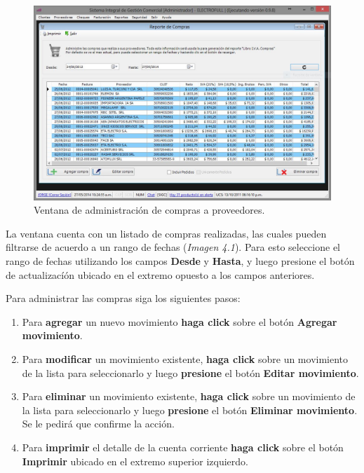 \documentclass{book}
\begin{document}
\begin{figure}[H]
	\centering
	\includegraphics[width=1.0\textwidth]{images/ventanas/ventana-07.jpg}
	\caption{Ventana de administración de compras a proveedores.}
	\medskip
\end{figure}
\medskip


La ventana cuenta con un listado de compras realizadas, las cuales pueden filtrarse de acuerdo a un rango de fechas (\textit{Imagen 4.1}). Para esto seleccione el rango de fechas utilizando los campos \textbf{Desde} y \textbf{Hasta}, y luego presione el botón de actualizacíón ubicado en el extremo opuesto a los campos anteriores. 
\par
Para administrar las compras siga los siguientes pasos:

\begin{enumerate}
	\itemsep=8pt \topsep=0pt \partopsep=0pt \parskip=0pt \parsep=0pt

	\item Para \textbf{agregar} un nuevo movimiento \textbf{haga click} sobre el botón \textbf{Agregar movimiento}.

	\item Para \textbf{modificar} un movimiento existente, \textbf{haga click} sobre un movimiento de la lista para seleccionarlo y luego \textbf{presione} el botón \textbf{Editar movimiento}.

	\item Para \textbf{eliminar} un movimiento existente, \textbf{haga click} sobre un movimiento de la lista para seleccionarlo y luego \textbf{presione} el botón \textbf{Eliminar movimiento}. Se le pedirá que confirme la acción.

	\item Para \textbf{imprimir} el detalle de la cuenta corriente \textbf{haga click} sobre el botón \textbf{Imprimir} ubicado en el extremo superior izquierdo.

\end{enumerate}
\medskip
\end{document}
